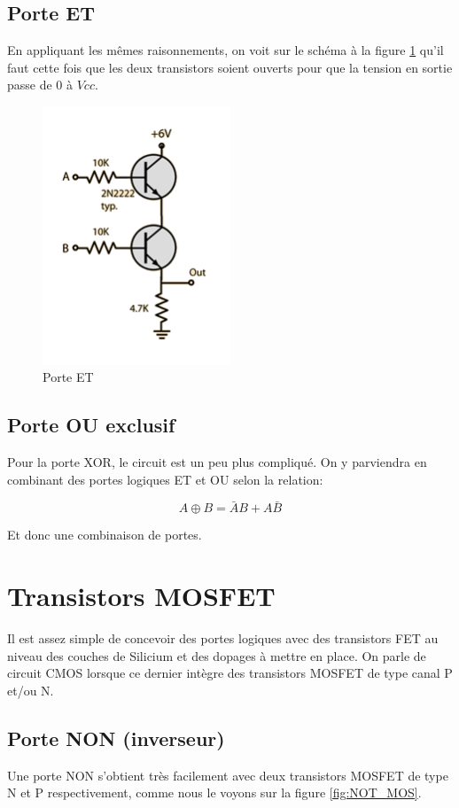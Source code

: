 \documentclass[a4paper,11pt]{book}
\theoremstyle{definition}
\begin{document}
\subsection{Porte ET}

En appliquant les mêmes raisonnements, on voit sur le schéma à la figure \ref{fig:AND} qu'il faut cette fois que les deux transistors soient ouverts pour que la tension en sortie passe de 0 à $Vcc$.

\begin{figure}
\centering
\includegraphics[width=0.5\textwidth]{media/ImplementationGates/and4.png}
\caption{Porte ET}
\label{fig:AND}
\end{figure}

\subsection{Porte OU exclusif}
Pour la porte XOR, le circuit est un peu plus compliqué. On y parviendra en combinant des portes logiques ET et OU selon la relation: 

\[ A \oplus B = \bar{A}B + A\bar{B} \]

Et donc une combinaison de portes.

\section{Transistors MOSFET}
Il est assez simple de concevoir des portes logiques avec des transistors FET au niveau des couches de Silicium et des dopages à mettre en place. On parle de circuit CMOS lorsque ce dernier intègre des transistors MOSFET de type canal P et/ou N.

\subsection{Porte NON (inverseur)}
Une porte NON s'obtient très facilement avec deux transistors MOSFET de type N et P respectivement, comme nous le voyons sur la figure \ref{fig:NOT_MOS}.
\end{document}
